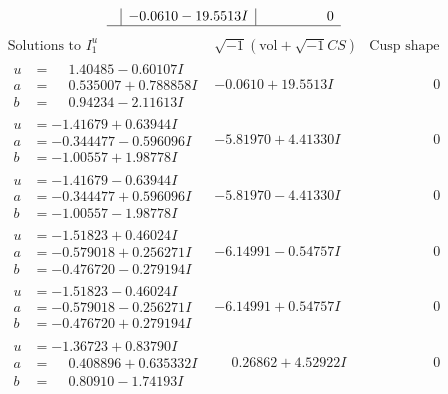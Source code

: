 \documentclass[1p]{elsarticle_modified}
\theoremstyle{definition}
\newcommand{\I}{\sqrt{-1}}
\begin{document}
$$\begin{array}{c|c|c}
 & -0.0610 - 19.5513 I & \phantom{-0.000000 } 0\\
 \hline 
 \end{array}$$\newpage$$\begin{array}{c|c|c}  
\text{Solutions to }I^u_{1}& \I (\text{vol} + \sqrt{-1}CS) & \text{Cusp shape}\\
 \hline 
\begin{aligned}
u &= \phantom{-}1.40485 - 0.60107 I \\
a &= \phantom{-}0.535007 + 0.788858 I \\
b &= \phantom{-}0.94234 - 2.11613 I\end{aligned}
 & -0.0610 + 19.5513 I & \phantom{-0.000000 } 0 \\ \hline\begin{aligned}
u &= -1.41679 + 0.63944 I \\
a &= -0.344477 - 0.596096 I \\
b &= -1.00557 + 1.98778 I\end{aligned}
 & -5.81970 + 4.41330 I & \phantom{-0.000000 } 0 \\ \hline\begin{aligned}
u &= -1.41679 - 0.63944 I \\
a &= -0.344477 + 0.596096 I \\
b &= -1.00557 - 1.98778 I\end{aligned}
 & -5.81970 - 4.41330 I & \phantom{-0.000000 } 0 \\ \hline\begin{aligned}
u &= -1.51823 + 0.46024 I \\
a &= -0.579018 + 0.256271 I \\
b &= -0.476720 - 0.279194 I\end{aligned}
 & -6.14991 - 0.54757 I & \phantom{-0.000000 } 0 \\ \hline\begin{aligned}
u &= -1.51823 - 0.46024 I \\
a &= -0.579018 - 0.256271 I \\
b &= -0.476720 + 0.279194 I\end{aligned}
 & -6.14991 + 0.54757 I & \phantom{-0.000000 } 0 \\ \hline\begin{aligned}
u &= -1.36723 + 0.83790 I \\
a &= \phantom{-}0.408896 + 0.635332 I \\
b &= \phantom{-}0.80910 - 1.74193 I\end{aligned}
 & \phantom{-}0.26862 + 4.52922 I & \phantom{-0.000000 } 0 \\ \hline\begin{aligned}

\end{aligned}
\end{array}$$
\end{document}
